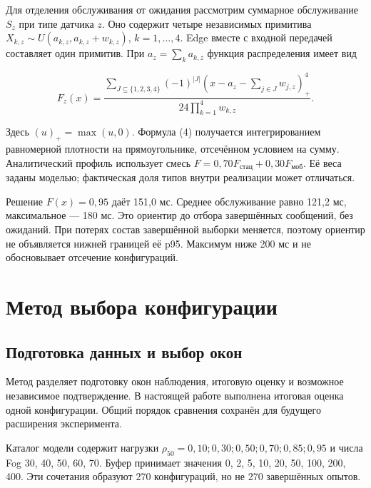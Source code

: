 Для отделения обслуживания от ожидания рассмотрим суммарное обслуживание \(S_z\) при типе датчика \(z\). Оно содержит четыре независимых примитива \(X_{k,z}\sim U(a_{k,z},a_{k,z}+w_{k,z})\), \(k=1,\ldots,4\). Edge вместе с входной передачей составляет один примитив. При \(a_z=\sum_k a_{k,z}\) функция распределения имеет вид

\begin{equation}\label{eq:4}
F_z(x)=\frac{\displaystyle\sum_{J\subseteq\{1,2,3,4\}}(-1)^{|J|}
\left(x-a_z-\sum_{j\in J}w_{j,z}\right)_+^4}
{24\displaystyle\prod_{k=1}^{4}w_{k,z}}.
\end{equation}

Здесь \((u)_+=\max(u,0)\). Формула (4) получается интегрированием равномерной плотности на прямоугольнике, отсечённом условием на сумму. Аналитический профиль использует смесь \(F=0{,}70F_{\text{стац}}+0{,}30F_{\text{моб}}\). Её веса заданы моделью; фактическая доля типов внутри реализации может отличаться.

Решение \(F(x)=0{,}95\) даёт 151,0 мс. Среднее обслуживание равно 121,2 мс, максимальное --- 180 мс. Это ориентир до отбора завершённых сообщений, без ожиданий. При потерях состав завершённой выборки меняется, поэтому ориентир не объявляется нижней границей её p95. Максимум ниже 200 мс и не обосновывает отсечение конфигураций.

\hypertarget{ux43cux435ux442ux43eux434-ux432ux44bux431ux43eux440ux430-ux43aux43eux43dux444ux438ux433ux443ux440ux430ux446ux438ux438}{%
\FloatBarrier
\section{Метод выбора конфигурации}}

\hypertarget{ux43fux43eux434ux433ux43eux442ux43eux432ux43aux430-ux434ux430ux43dux43dux44bux445-ux438-ux432ux44bux431ux43eux440-ux43eux43aux43eux43d}{%
\subsection{Подготовка данных и выбор окон}}

Метод разделяет подготовку окон наблюдения, итоговую оценку и возможное независимое подтверждение. В настоящей работе выполнена итоговая оценка одной конфигурации. Общий порядок сравнения сохранён для будущего расширения эксперимента.

Каталог модели содержит нагрузки \(\rho_{50}=0{,}10;\allowbreak 0{,}30;\allowbreak 0{,}50;\allowbreak 0{,}70;\allowbreak 0{,}85;\allowbreak 0{,}95\) и числа Fog 30, 40, 50, 60, 70. Буфер принимает значения 0, 2, 5, 10, 20, 50, 100, 200, 400. Эти сочетания образуют 270 конфигураций, но не 270 завершённых опытов.

